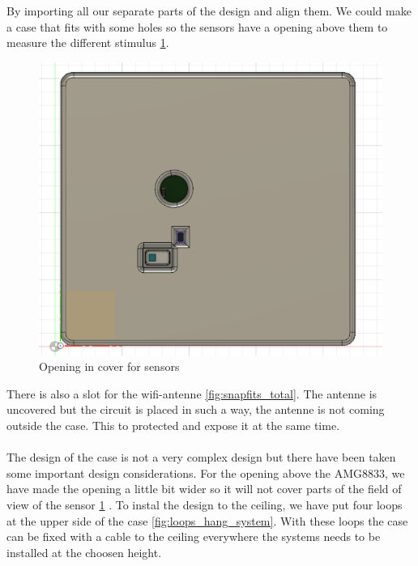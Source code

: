 \documentclass[11pt,a4paper]{article}
\begin{document}
By importing all our separate parts of the design and align them. We could make a case that fits with some holes so the sensors have a opening above them to measure the different stimulus \ref{fig:opening_sensors}. 
\begin{figure}[H]
	\centering
	\includegraphics[width=1.0\linewidth]{opening_sensors.png}
	\caption{Opening in cover for sensors}
	\label{fig:opening_sensors}
\end{figure}
There is also a slot for the wifi-antenne \ref{fig:snapfits_total}. The antenne is uncovered but the circuit is placed in such a way, the antenne is not coming outside the case. This to protected and expose it at the same time.
\\ \\
The design of the case is not a very complex design but there have been taken some important design considerations. For the opening above the AMG8833, we have made the opening a little bit wider so it will not cover parts of the field of view of the sensor \ref{fig:opening_sensors} . To instal the design to the ceiling, we have put four loops at the upper side of the case \ref{fig:loops_hang_system}. With these loops the case can be fixed with a cable to the ceiling everywhere the systems needs to be installed at the choosen height.
\end{document}
